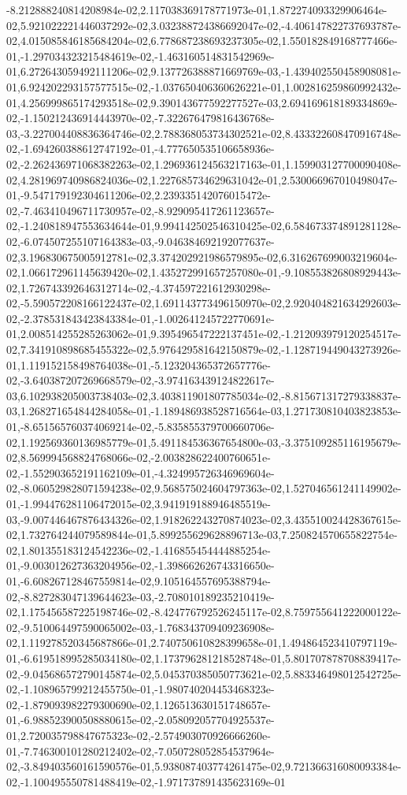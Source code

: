 -8.212888240814208984e-02,2.117038369178771973e-01,1.872274093329906464e-02,5.921022221446037292e-02,3.032388724386692047e-02,-4.406147822737693787e-02,4.015085846185684204e-02,6.778687238693237305e-02,1.550182849168777466e-01,-1.297034323215484619e-02,-1.463160514831542969e-01,6.272643059492111206e-02,9.137726388871669769e-03,-1.439402550458908081e-01,6.924202293157577515e-02,-1.037650406360626221e-01,1.002816259860992432e-01,4.256999865174293518e-02,9.390143677592277527e-03,2.694169618189334869e-02,-1.150212436914443970e-02,-7.322676479816436768e-03,-3.227004408836364746e-02,2.788368053734302521e-02,8.433322608470916748e-02,-1.694260388612747192e-01,-4.777650535106658936e-02,-2.262436971068382263e-02,1.296936124563217163e-01,1.159903127700090408e-02,4.281969740986824036e-02,1.227685734629631042e-01,2.530066967010498047e-01,-9.547179192304611206e-02,2.239335142076015472e-02,-7.463410496711730957e-02,-8.929095417261123657e-02,-1.240818947553634644e-01,9.994142502546310425e-02,6.584673374891281128e-02,-6.074507255107164383e-03,-9.046384692192077637e-02,3.196830675005912781e-02,3.374202921986579895e-02,6.316267699003219604e-02,1.066172961145639420e-02,1.435272991657257080e-01,-9.108553826808929443e-02,1.726743392646312714e-02,-4.374597221612930298e-02,-5.590572208166122437e-02,1.691143773496150970e-02,2.920404821634292603e-02,-2.378531843423843384e-01,-1.002641245722770691e-01,2.008514255285263062e-01,9.395496547222137451e-02,-1.212093979120254517e-02,7.341910898685455322e-02,5.976429581642150879e-02,-1.128719449043273926e-01,1.119152158498764038e-01,-5.123204365372657776e-02,-3.640387207269668579e-02,-3.974163439124822617e-03,6.102938205003738403e-02,3.403811901807785034e-02,-8.815671317279338837e-03,1.268271654844284058e-01,-1.189486938528716564e-03,1.271730810403823853e-01,-8.651565760374069214e-02,-5.835855379700660706e-02,1.192569360136985779e-01,5.491184536367654800e-03,-3.375109285116195679e-02,8.569994568824768066e-02,-2.003828622400760651e-02,-1.552903652191162109e-01,-4.324995726346969604e-02,-8.060529828071594238e-02,9.568575024604797363e-02,1.527046561241149902e-01,-1.994476281106472015e-02,3.941919188946485519e-03,-9.007446467876434326e-02,1.918262243270874023e-02,3.435510024428367615e-02,1.732764244079589844e-01,5.899255629628896713e-03,7.250824570655822754e-02,1.801355183124542236e-02,-1.416855454444885254e-01,-9.003012627363204956e-02,-1.398662626743316650e-01,-6.608267128467559814e-02,9.105164557695388794e-02,-8.827283047139644623e-03,-2.708010189235210419e-02,1.175456587225198746e-02,-8.424776792526245117e-02,8.759755641222000122e-02,-9.510064497590065002e-03,-1.768343709409236908e-02,1.119278520345687866e-01,2.740750610828399658e-01,1.494864523410797119e-01,-6.619518995285034180e-02,1.173796281218528748e-01,5.801707878708839417e-02,-9.045686572790145874e-02,5.045370385050773621e-02,5.883346498012542725e-02,-1.108965799212455750e-01,-1.980740204453468323e-02,-1.879093982279300690e-02,1.126513630151748657e-01,-6.988523900508880615e-02,-2.058092057704925537e-01,2.720035798847675323e-02,-2.574903070926666260e-01,-7.746300101280212402e-02,-7.050728052854537964e-02,-3.849403560161590576e-01,5.938087403774261475e-02,9.721366316080093384e-02,-1.100495550781488419e-02,-1.971737891435623169e-01
